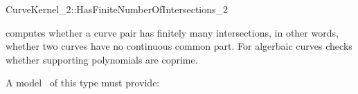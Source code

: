 \begin{ccRefFunctionObjectConcept}{CurveKernel_2::HasFiniteNumberOfIntersections_2}

\ccDefinition
computes whether a curve pair has finitely many intersections, in other words, whether two curves have no continuous common part. For algerbaic curves checks whether supporting polynomials are
coprime.
 
\ccRefines 
{} 

\ccTypes
{}
\ccGlue
{}
\ccGlue
{}

\ccOperations
{}

A model \ccVar\ of this type must provide:

{}

\ccSeeAlso
{}\\

\end{ccRefFunctionObjectConcept}
